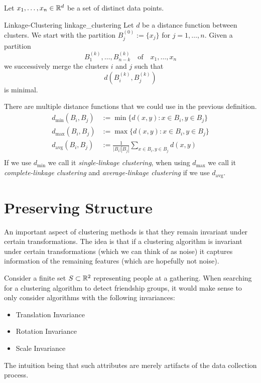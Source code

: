 Let $x_1, \dots, x_n \in \mathbb R^d$ be a set of distinct data points.
\begin{definition}{Linkage-Clustering }{linkage_clustering}
Let $d$ be a distance function between clusters. We start with the partition $B^{(0)}_j := \{x_j\}$ for $j = 1, \dots, n$.
Given a partition
$$
B^{(k)}_1, \dots, B^{(k)}_{n - k} \quad \text{of} \quad x_1, \dots, x_n
$$
we successively merge the clusters $i$ and $j$ such that
$$
d(B^{(k)}_i,B^{(k)}_j)
$$
is minimal.
\end{definition}

There are multiple distance functions that we could use in the previous definition.
\begin{align*}
d_\mathrm{min} (B_i, B_j) &:= \min\{d(x,y): x \in B_i, y \in B_j\}\\
d_\mathrm{max} (B_i, B_j) &:= \max\{d(x,y): x \in B_i, y \in B_j\}\\
d_\mathrm{avg}(B_i,B_j) &:= \frac{1}{|B_i||B_j|} \sum_{x \in B_i, y \in B_j} d(x,y)\\
\end{align*}
If we use $d_\mathrm{min}$ we call it \emph{single-linkage clustering}, when using $d_\mathrm{max}$ we call it \emph{complete-linkage clustering} and \emph{average-linkage clustering} if we use $d_\mathrm{avg}$.

\section{Preserving Structure}
\label{seciton__preserving_structure}
An important aspect of clustering methods is that they remain invariant under certain transformations.
The idea is that if a clustering algorithm is invariant under certain transformations (which we can think of as noise) it captures information of the remaining features (which are hopefully not noise).

\begin{example}{}{}
Consider a finite set $S \subset \mathbb R^2$ representing people at a gathering. When searching for a clustering algorithm to detect friendship groups, it would make sense to only consider algorithms with the following invariances:
\begin{itemize}
    \item Translation Invariance
    \item Rotation Invariance
    \item Scale Invariance
\end{itemize}
The intuition being that such attributes are merely artifacts of the data collection process.
\end{example}

